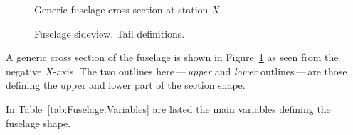 \documentclass[a4paper]{article}
\begin{document}
\begin{figure}[t]
\centering
{}
\caption{Generic fuselage cross section at station $X$.}
\label{fig:Fuselage:Sectionview}
\end{figure}

\begin{figure}[t]
\centering
{}
\caption{Fuselage sideview. Tail definitions.}
\label{fig:Fuselage:Sideview:Tail}
\end{figure}



A generic cross section of the fuselage is shown in Figure~\ref{fig:Fuselage:Sectionview}
as seen from the negative $X$-axis. The two outlines here\,---\,\emph{upper} and \emph{lower} 
outlines\,---\,are those defining the upper and lower part of the section shape.


In Table~\ref{tab:Fuselage:Variables} are listed the main variables defining the 
fuselage shape.
\end{document}
